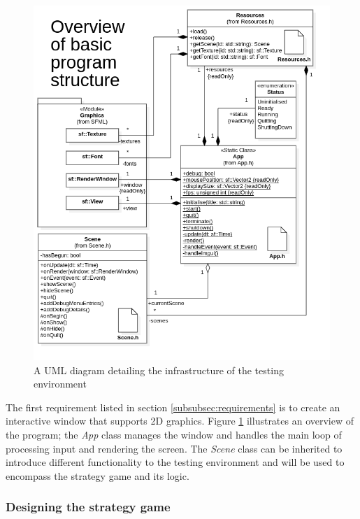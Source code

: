 \documentclass[11pt, a4paper]{article}
\begin{document}
\begin{figure}[!h]
  \centering
  \includegraphics[width=\linewidth]{img/app_overview.png}
  \caption{A UML diagram detailing the infrastructure of the testing environment}
  \label{fig:foundationsUML}
\end{figure}

The first requirement listed in section \ref{subsubsec:requirements} is to create an interactive window that supports 2D graphics. Figure \ref{fig:foundationsUML} illustrates an overview of the program; the \emph{App} class manages the window and handles the main loop of processing input and rendering the screen. The \emph{Scene} class can be inherited to introduce different functionality to the testing environment and will be used to encompass the strategy game and its logic.

\subsubsection{Designing the strategy game}
\label{subsubsec:designingStrategyGame}
\end{document}
